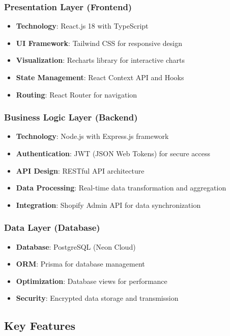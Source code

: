 \documentclass[12pt]{article}
\begin{document}
\subsubsection{Presentation Layer (Frontend)}
\begin{itemize}
    \item \textbf{Technology}: React.js 18 with TypeScript
    \item \textbf{UI Framework}: Tailwind CSS for responsive design
    \item \textbf{Visualization}: Recharts library for interactive charts
    \item \textbf{State Management}: React Context API and Hooks
    \item \textbf{Routing}: React Router for navigation
\end{itemize}

\subsubsection{Business Logic Layer (Backend)}
\begin{itemize}
    \item \textbf{Technology}: Node.js with Express.js framework
    \item \textbf{Authentication}: JWT (JSON Web Tokens) for secure access
    \item \textbf{API Design}: RESTful API architecture
    \item \textbf{Data Processing}: Real-time data transformation and aggregation
    \item \textbf{Integration}: Shopify Admin API for data synchronization
\end{itemize}

\subsubsection{Data Layer (Database)}
\begin{itemize}
    \item \textbf{Database}: PostgreSQL (Neon Cloud)
    \item \textbf{ORM}: Prisma for database management
    \item \textbf{Optimization}: Database views for performance
    \item \textbf{Security}: Encrypted data storage and transmission
\end{itemize}

\subsection{Key Features}
\end{document}
